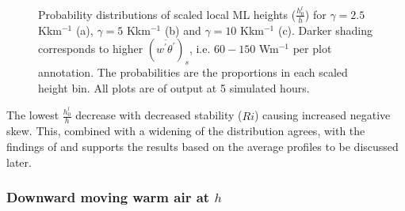 \documentclass[referee]{svjour3}
\begin{document}
\begin{figure}[htbp]
\quad
\begin{center}
        \\      
\end{center}       

        \caption[Local Scaled ML Height Distributions]{Probability distributions of scaled local ML heights ($\frac{h^{l}_{0}}{h}$) for $\gamma = 2.5$ Kkm$^{-1}$ (a), $\gamma = 5$ Kkm$^{-1}$ (b) and $\gamma = 10$ Kkm$^{-1}$ (c). Darker shading corresponds to higher $(\overline{w^{'}\theta^{'}})_{s}$, i.e. $60 - 150$ Wm$^{-1}$ per plot annotation.  The probabilities are the proportions in each scaled height bin. All plots are of output at 5 simulated hours.}
    
        \label{fig:localhdist}
\end{figure}

The lowest $\frac{h^{l}_{0}}{h}$ decrease with decreased stability ($Ri$) causing increased negative skew. This, combined with a widening of the distribution agrees, with the findings of \cite{Sullivan98} and supports the results based on the average profiles to be discussed later. \\  

\subsubsection{Downward moving warm air at $h$}
\label{subsubsec:downwarm}
\end{document}
